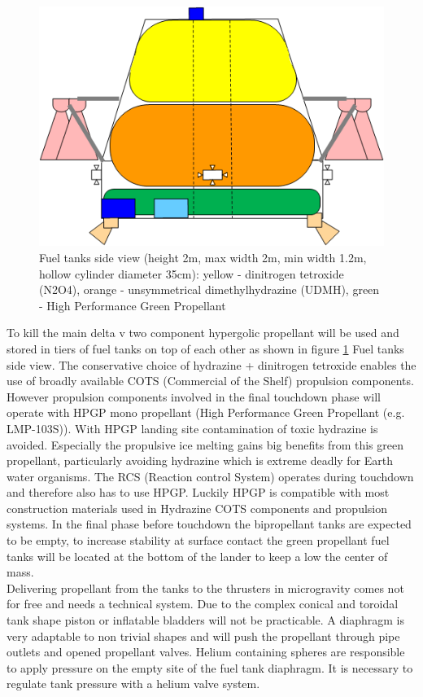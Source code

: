 \begin{figure}[htb]
	\centering
	\includegraphics[width=\textwidth]{figures/Lander/aaronfueltank}
	\caption{Fuel tanks side view (height 2m, max width 2m, min width 1.2m, hollow cylinder diameter 35cm): yellow - dinitrogen tetroxide (N2O4), orange - unsymmetrical dimethylhydrazine (UDMH), green - High Performance Green Propellant \label{fig:afuelTank}}
\end{figure}

To kill the main delta v two component hypergolic propellant will be used and stored in tiers of fuel tanks on top of each other as shown in figure \ref{fig:afuelTank} Fuel tanks side view. The conservative choice of hydrazine + dinitrogen tetroxide enables the  use of broadly available COTS (Commercial of the Shelf) propulsion components. However propulsion components involved in the final touchdown phase will operate with HPGP mono propellant (High Performance Green Propellant (e.g. LMP-103S)). With HPGP landing site contamination of toxic hydrazine is avoided. Especially the propulsive ice melting gains big benefits from this green propellant, particularly avoiding hydrazine which is extreme deadly for Earth water organisms. The RCS (Reaction control System) operates during touchdown and therefore also has to use HPGP. Luckily HPGP is compatible with most construction materials used in Hydrazine COTS components and propulsion systems. In the final phase before touchdown the bipropellant tanks are expected to be empty, to increase stability at surface contact the green propellant fuel tanks will be located at the bottom of the lander to keep a low the center of mass.\\
Delivering propellant from the tanks to the thrusters in microgravity comes not for free and needs a technical system. Due to the complex conical and toroidal tank shape piston or inflatable bladders will not be practicable. A diaphragm is very adaptable to non trivial shapes and will push the propellant through pipe outlets and opened propellant valves. Helium containing spheres  are responsible to apply pressure on the empty site of the fuel tank diaphragm. It is necessary to regulate tank pressure with a helium valve system.\\

